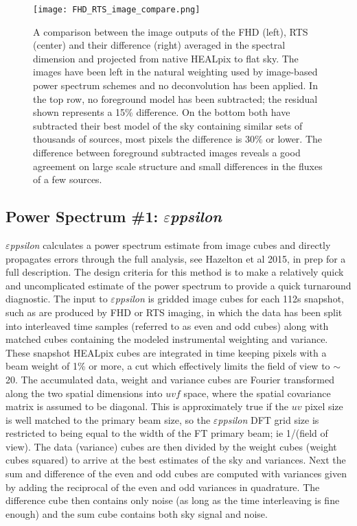 \documentclass[twolcolumn]{emulateapj}
\def\eppsilon{{\it $\varepsilon$ppsilon}}
\def\eppsiloncite{Hazelton et al 2015, in prep}
\begin{document}
\begin{figure}[htb]
\begin{center}
\texttt{[image: FHD\_RTS\_image\_compare.png]}
\caption{A comparison between the image outputs of the FHD (left), RTS (center) and their difference (right) averaged in the spectral dimension and projected from native HEALpix to flat sky. The images have been left in the natural weighting used by image-based power spectrum schemes and no deconvolution has been applied.   In the top row, no foreground model has been subtracted; the residual shown represents a 15\% difference. On the bottom both have subtracted their best model of the sky containing similar sets of thousands of sources, most pixels the difference is 30\% or lower.   The difference between foreground subtracted images reveals a good agreement on large scale structure and small differences in the fluxes of a few sources.
\label{fig:image_compare}}
\end{center}
\end{figure}


\subsection{Power Spectrum \#1: \eppsilon}
\label{sec:EPPSILON}
\eppsilon{} calculates a power spectrum estimate from image cubes and
directly propagates errors through the full analysis, see \eppsiloncite{} for a full description. The design criteria for this method is to make a relatively quick and uncomplicated estimate of the power spectrum to provide a quick turnaround diagnostic. The input to \eppsilon{} is gridded image cubes for  each 112s snapshot, such as are produced by FHD or RTS imaging, in which the data has been split into interleaved time samples (referred to as even and odd cubes) along with matched cubes containing the modeled instrumental weighting and variance. These snapshot HEALpix cubes are integrated in time keeping pixels with a beam weight of 1\% or more, a cut which effectively limits the field of view to $\sim$20\arcdeg. The accumulated data, weight and variance cubes are Fourier transformed along the two spatial dimensions into $uvf$ space, where the spatial covariance matrix is assumed to be diagonal. This is approximately true if the $uv$ pixel size is well matched to the primary beam size, so the  \eppsilon{} DFT grid size is restricted to being equal to the width of the FT primary beam; ie 1/(field of view). The data (variance) cubes are then divided by the weight cubes (weight cubes squared) to arrive at the best estimates of the sky and variances. Next the sum and difference of the even and odd cubes are computed with variances given by adding the reciprocal of the even and odd variances in quadrature. The difference cube then contains only noise (as long as the time interleaving is fine enough) and the sum cube contains both sky signal and noise.
\end{document}
